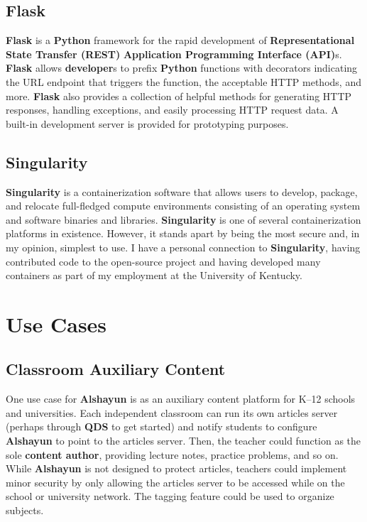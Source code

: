 \documentclass[12pt]{report}
\begin{document}
    \section{Flask}

\textbf{Flask} \cite{flask} is a \textbf{Python} framework for the rapid
development of \textbf{Representational State Transfer (REST)}
\textbf{Application Programming Interface (API)}s. \textbf{Flask} allows
\textbf{developer}s to prefix \textbf{Python} functions with decorators
indicating the URL endpoint that triggers the function, the acceptable HTTP
methods, and more. \textbf{Flask} also provides a collection of helpful methods
for generating HTTP responses, handling exceptions, and easily processing HTTP
request data. A built-in development server is provided for prototyping
purposes.
    
    \section{Singularity}

\textbf{Singularity} \cite{singularity} is a containerization software that
allows users to develop, package, and relocate full-fledged compute environments
consisting of an operating system and software binaries and libraries.
\textbf{Singularity} is one of several containerization platforms in existence.
However, it stands apart by being the most secure and, in my opinion, simplest
to use. I have a personal connection to \textbf{Singularity}, having contributed
code to the open-source project and having developed many containers as part of
my employment at the University of Kentucky.

\chapter{Use Cases}

    \section{Classroom Auxiliary Content}

One use case for \textbf{Alshayun} is as an auxiliary content platform for K--12
schools and universities. Each independent classroom can run its own articles
server (perhaps through \textbf{QDS} to get started) and notify students to
configure \textbf{Alshayun} to point to the articles server. Then, the teacher
could function as the sole \textbf{content author}, providing lecture notes,
practice problems, and so on. While \textbf{Alshayun} is not designed to protect
articles, teachers could implement minor security by only allowing the articles
server to be accessed while on the school or university network. The tagging
feature could be used to organize subjects.
\end{document}
